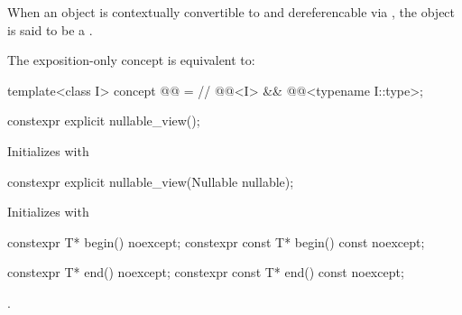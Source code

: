 \documentclass[a4paper,10pt,oneside,openany,final,article]{memoir}
\begin{document}
\begin{wording}
\begin{itemdecl}
\end{itemdecl}

\begin{itemdescr}
\pnum
When an object is contextually convertible to  and dereferencable via , the object is said to be a .

\end{itemdescr}

\pnum
The exposition-only  concept is equivalent to:
\begin{itemdecl}
  template<class I>
  concept @@ =               // \expos
  @@<I>
     && @@<typename I::type>;

\end{itemdecl}

%

\pnum
\begin{itemdecl}
constexpr explicit nullable_view();
\end{itemdecl}
\begin{itemdescr}
\pnum{}
\effects{}
Initializes  with 
\end{itemdescr}

\begin{itemdecl}
constexpr explicit nullable_view(Nullable nullable);
\end{itemdecl}
\begin{itemdescr}
\pnum{}
\effects{}
Initializes  with 
\end{itemdescr}

\begin{itemdecl}
constexpr T* begin() noexcept;
constexpr const T* begin() const noexcept;
\end{itemdecl}

\begin{itemdescr}
\pnum
\returns
{}
\end{itemdescr}

\begin{itemdecl}
constexpr T* end() noexcept;
constexpr const T* end() const noexcept;
\end{itemdecl}

\begin{itemdescr}
\pnum{}
\returns {}.
\end{itemdescr}


\end{wording}
\end{document}
